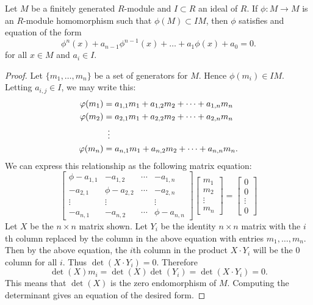 \documentclass{ximera}
\begin{document}
\begin{proposition}\label{P:determinanttrick}
  Let $M$ be a finitely generated $R$-module and $I\subset R$ an ideal
  of $R$. If $\phi:M\to M$ is an $R$-module homomorphism such that
  $\phi(M)\subset I M$, then $\phi$ satisfies and equation of the form
  \[
  \phi^n(x) + a_{n-1}\phi^{n-1}(x) + \dots + a_1 \phi(x)  + a_0 = 0.
  \]
  for all $x\in M$ and $a_i\in I$.
  \begin{proof}
    Let $\{m_1,\dots, m_n\}$ be a set of generators for $M$. Hence $\phi(m_i) \in I M$. Letting $a_{i,j}\in I$, we may write this:
    \begin{align*}
      \phi(m_1) &= a_{1,1}m_1 + a_{1,2}m_2 + \dots + a_{1,n}m_n\\
      \phi(m_2) &= a_{2,1}m_1 + a_{2,2}m_2 + \dots + a_{2,n}m_n\\
      &\hspace{.5em}  \vdots \\
      \phi(m_n) &= a_{n,1}m_1 + a_{n,2}m_2 + \dots + a_{n,n}m_n. 
    \end{align*}
    We can express this relationship as the following matrix equation:
    \[
    \begin{bmatrix}
      \phi - a_{1,1} & - a_{1,2} & \cdots & - a_{1,n}\\
      - a_{2,1} & \phi - a_{2,2} & \cdots & - a_{2,n}\\
      \vdots & \vdots & & \vdots \\
      -a_{n,1} & -a_{n,2} & \cdots & \phi - a_{n,n}
    \end{bmatrix}
    \begin{bmatrix}
      m_1\\
      m_2\\
      \vdots \\
      m_n
    \end{bmatrix}
    =
    \begin{bmatrix}
      0\\
      0\\
      \vdots\\
      0
    \end{bmatrix}
    \]
    Let $X$ be the $n \times n$ matrix shown.  Let $Y_i$ be the
    identity $n \times n$ matrix with the $i$th column replaced by the
    column in the above equation with entries $m_1,\dots,m_n$.  Then
    by the above equation, the $i$th column in the product $X\cdot
    Y_i$ will be the $0$ column for all $i$.  Thus $\det(X\cdot Y_i)
    =0$.  Therefore
    \[
    \det(X) m_i = \det(X) \det(Y_i) = \det(X \cdot Y_i) = 0.
    \]
    This means that $\det(X)$ is the zero endomorphism of
    $M$. Computing the determinant gives an equation of the desired
    form.
  \end{proof}
\end{proposition}
\end{document}
